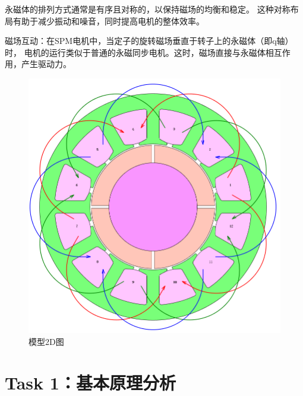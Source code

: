 \documentclass{thuemp}
\begin{document}
永磁体的排列方式通常是有序且对称的，以保持磁场的均衡和稳定。
这种对称布局有助于减少振动和噪音，同时提高电机的整体效率。

磁场互动：在SPM电机中，当定子的旋转磁场垂直于转子上的永磁体（即q轴）时，
电机的运行类似于普通的永磁同步电机。这时，磁场直接与永磁体相互作用，产生驱动力。
\begin{figure}[H]
  \centering
  \includegraphics[width=1\linewidth]{./img/task1/model1.png}
  \caption{模型2D图}
\end{figure}

\section{Task 1：基本原理分析}
\end{document}
